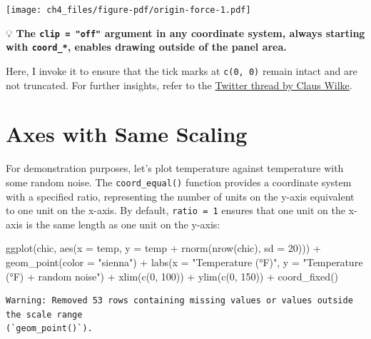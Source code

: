 \documentclass[
  letterpaper,
  DIV=11,
  numbers=noendperiod]{scrreprt}
\newenvironment{Shaded}{\begin{snugshade}}{\end{snugshade}}
\newcommand{\AttributeTok}[1]{\textcolor[rgb]{0.40,0.45,0.13}{#1}}
\newcommand{\DecValTok}[1]{\textcolor[rgb]{0.68,0.00,0.00}{#1}}
\newcommand{\FunctionTok}[1]{\textcolor[rgb]{0.28,0.35,0.67}{#1}}
\newcommand{\NormalTok}[1]{\textcolor[rgb]{0.00,0.23,0.31}{#1}}
\newcommand{\SpecialCharTok}[1]{\textcolor[rgb]{0.37,0.37,0.37}{#1}}
\newcommand{\StringTok}[1]{\textcolor[rgb]{0.13,0.47,0.30}{#1}}
\begin{document}
\texttt{[image: ch4\_files/figure-pdf/origin-force-1.pdf]}

💡 \textbf{The \texttt{clip\ =\ "off"} argument in any coordinate
system, always starting with \texttt{coord\_*}, enables drawing outside
of the panel area.}

Here, I invoke it to ensure that the tick marks at \texttt{c(0,\ 0)}
remain intact and are not truncated. For further insights, refer to the
\href{https://twitter.com/clauswilke/status/991542952802619392?lang=en}{Twitter
thread by Claus Wilke}.

\section{Axes with Same Scaling}\label{axes-with-same-scaling}

For demonstration purposes, let's plot temperature against temperature
with some random noise. The \texttt{coord\_equal()} function provides a
coordinate system with a specified ratio, representing the number of
units on the y-axis equivalent to one unit on the x-axis. By default,
\texttt{ratio\ =\ 1} ensures that one unit on the x-axis is the same
length as one unit on the y-axis:

\begin{Shaded}
\begin{Highlighting}[]
\FunctionTok{ggplot}\NormalTok{(chic, }\FunctionTok{aes}\NormalTok{(}\AttributeTok{x =}\NormalTok{ temp, }\AttributeTok{y =}\NormalTok{ temp }\SpecialCharTok{+} \FunctionTok{rnorm}\NormalTok{(}\FunctionTok{nrow}\NormalTok{(chic), }\AttributeTok{sd =} \DecValTok{20}\NormalTok{))) }\SpecialCharTok{+}
  \FunctionTok{geom\_point}\NormalTok{(}\AttributeTok{color =} \StringTok{"sienna"}\NormalTok{) }\SpecialCharTok{+}
  \FunctionTok{labs}\NormalTok{(}\AttributeTok{x =} \StringTok{"Temperature (°F)"}\NormalTok{, }\AttributeTok{y =} \StringTok{"Temperature (°F) + random noise"}\NormalTok{) }\SpecialCharTok{+}
  \FunctionTok{xlim}\NormalTok{(}\FunctionTok{c}\NormalTok{(}\DecValTok{0}\NormalTok{, }\DecValTok{100}\NormalTok{)) }\SpecialCharTok{+} \FunctionTok{ylim}\NormalTok{(}\FunctionTok{c}\NormalTok{(}\DecValTok{0}\NormalTok{, }\DecValTok{150}\NormalTok{)) }\SpecialCharTok{+}
  \FunctionTok{coord\_fixed}\NormalTok{()}
\end{Highlighting}
\end{Shaded}

\begin{verbatim}
Warning: Removed 53 rows containing missing values or values outside the scale range
(`geom_point()`).
\end{verbatim}
\end{document}

